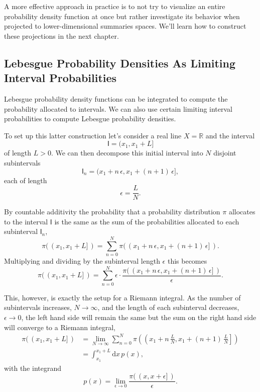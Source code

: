 \documentclass[
  letterpaper,
  DIV=11,
  numbers=noendperiod]{scrartcl}
\begin{document}
A more effective approach in practice is to not try to visualize an
entire probability density function at once but rather investigate its
behavior when projected to lower-dimensional summaries spaces. We'll
learn how to construct these projections in the next chapter.

\hypertarget{lebesgue-probability-densities-as-limiting-interval-probabilities}{%
\subsection{Lebesgue Probability Densities As Limiting Interval
Probabilities}\label{lebesgue-probability-densities-as-limiting-interval-probabilities}}

Lebesgue probability density functions can be integrated to compute the
probability allocated to intervals. We can also use certain limiting
interval probabilities to compute Lebesgue probability densities.

To set up this latter construction let's consider a real line
\(X = \mathbb{R}\) and the interval \[
\mathsf{I} = (x_{1}, x_{1} + L ]
\] of length \(L > 0\). We can then decompose this initial interval into
\(N\) disjoint subintervals \[
\mathsf{I}_{n}
= ( x_{1} + n \, \epsilon , x_{1} + (n + 1) \, \epsilon ],
\] each of length \[
\epsilon = \frac{L}{N}.
\]

By countable additivity the probability that a probability distribution
\(\pi\) allocates to the interval \(\mathsf{I}\) is the same as the sum
of the probabilities allocated to each subinterval \(\mathsf{I}_{n}\),
\[
\pi( \, ( x_{1}, x_{1} + L ] \, )
=
\sum_{n = 0}^{N}
\pi( \, ( x_{1} + n \, \epsilon , x_{1} + (n + 1) \, \epsilon ] \, ).
\] Multiplying and dividing by the subinterval length \(\epsilon\) this
becomes \[
\pi( \, ( x_{1}, x_{1} + L ] \, )
=
\sum_{n = 0}^{N} \epsilon \cdot
\frac{
\pi( \, ( x_{1} + n \, \epsilon, x_{1} + (n + 1) \, \epsilon ] \, )
}{ \epsilon }.
\]

This, however, is exactly the setup for a Riemann integral. As the
number of subintervals increases, \(N \rightarrow \infty\), and the
length of each subinterval decreases, \(\epsilon \rightarrow 0\), the
left hand side will remain the same but the sum on the right hand side
will converge to a Riemann integral, \begin{align*}
\pi( \, ( x_{1}, x_{1} + L ] \, )
&=
\lim_{N \rightarrow \infty}
\sum_{n = 0}^{N}
\pi \left( \left( x_{1} + n \, \frac{L}{N},
                  x_{1} + (n + 1) \, \frac{L}{N} \right] \right)
\\
&=
\int_{x_{1}}^{x_{1} + L} \mathrm{d} x \, p(x),
\end{align*} with the integrand \[
p(x) = \lim_{\epsilon \rightarrow 0}
\frac{ \pi( \, ( x, x + \epsilon ] \, ) }{ \epsilon }.
\]
\end{document}
